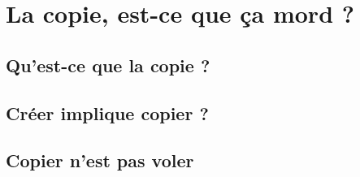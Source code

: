\chapter{La copie, est-ce que ça mord ?}

\section{Qu'est-ce que la copie ?}

\section{Créer implique copier ?}

\section{Copier n'est pas voler}
